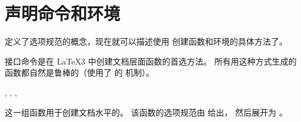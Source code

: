 \documentclass{l3doc}
\begin{document}
\section{声明命令和环境}

%
定义了选项规范的概念，现在就可以描述使用  创建函数和环境的具体方法了。

%
接口命令是在 \LaTeX3 中创建文档层面函数的首选方法。
所有用这种方式生成的函数都自然是鲁棒的（使用了 \eTeX{} 的  机制）。

\begin{function}
    {
             \NewDocumentCommand     ,
             \RenewDocumentCommand   ,
             \ProvideDocumentCommand ,
             \DeclareDocumentCommand
    }
    \begin{syntax}
           
    \end{syntax}
    这一组函数用于创建文档水平的。
    该函数的选项规范由  给出，
    然后展开为 。
%
\end{function}
\end{document}
